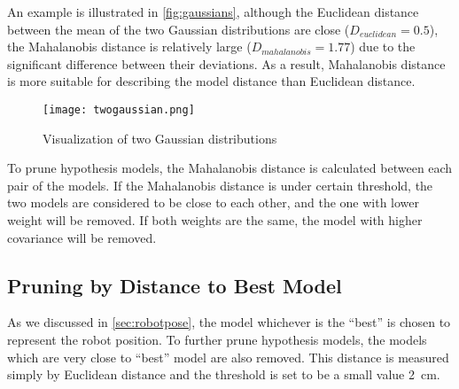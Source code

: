 An example is illustrated in \autoref{fig:gaussians}, although the Euclidean distance between the mean of the two Gaussian distributions are close ($D_{euclidean}=0.5$), the Mahalanobis distance is relatively large ($D_{mahalanobis}=1.77$) due to the significant difference between their deviations. As a result, Mahalanobis distance is more suitable for describing the model distance than Euclidean distance.

\begin{figure}[tbh]
\begin{center}
	\texttt{[image: twogaussian.png]}
\end{center}
\caption{Visualization of two Gaussian distributions}
\label{fig:gaussians}
\end{figure}

To prune hypothesis models, the Mahalanobis distance is calculated between each pair of the models. If the Mahalanobis distance is under certain threshold, the two models are considered to be close to each other, and the one with lower weight will be removed. If both weights are the same, the model with higher covariance will be removed.


\subsection{Pruning by Distance to Best Model}
\label{sub:Pruning by Distance to Best Model}

As we discussed in \autoref{sec:robotpose}, the model whichever is the ``best'' is chosen to represent the robot position. To further prune hypothesis models, the models which are very close to ``best'' model are also removed. This distance is measured simply by Euclidean distance and the threshold is set to be a small value \SI{2}{\cm}.

